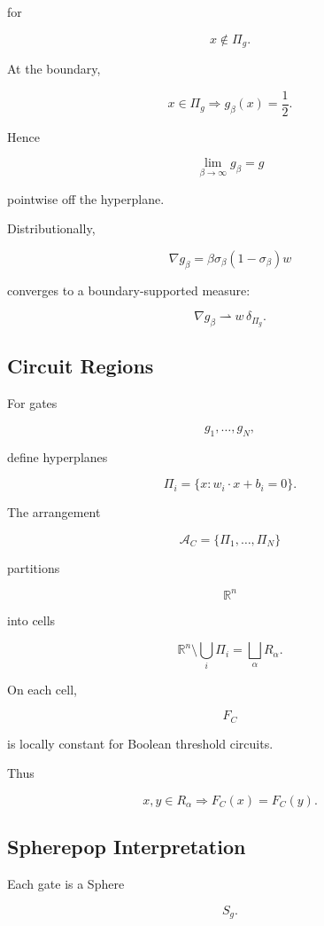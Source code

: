 \documentclass[12pt,oneside]{article}
\theoremstyle{definition}
\theoremstyle{remark}
\begin{document}
for

\[
x\notin\Pi_g.
\]

At the boundary,

\[
x\in\Pi_g
\Longrightarrow
g_\beta(x)=\frac12.
\]

Hence

\[
\lim_{\beta\rightarrow\infty}
g_\beta
=
g
\]

pointwise off the hyperplane.

Distributionally,

\[
\nabla g_\beta
=
\beta
\sigma_\beta(1-\sigma_\beta)w
\]

converges to a boundary-supported measure:

\[
\nabla g_\beta
\rightharpoonup
w\,\delta_{\Pi_g}.
\]

\subsection*{Circuit Regions}

For gates

\[
g_1,\ldots,g_N,
\]

define hyperplanes

\[
\Pi_i
=
\{x:w_i\cdot x+b_i=0\}.
\]

The arrangement

\[
\mathcal A_C
=
\{\Pi_1,\ldots,\Pi_N\}
\]

partitions

\[
\mathbb R^n
\]

into cells

\[
\mathbb R^n\setminus
\bigcup_i\Pi_i
=
\bigsqcup_{\alpha}
R_\alpha.
\]

On each cell,

\[
F_C
\]

is locally constant for Boolean threshold circuits.

Thus

\[
x,y\in R_\alpha
\Longrightarrow
F_C(x)=F_C(y).
\]

\subsection*{Spherepop Interpretation}

Each gate is a Sphere

\[
S_g.
\]
\end{document}
